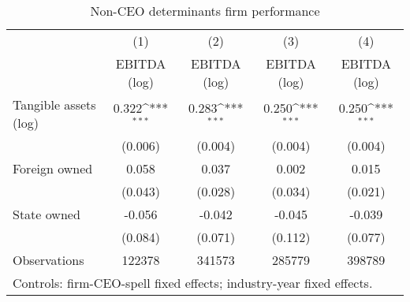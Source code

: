\begin{table}[htbp]\centering
\def\sym#1{\ifmmode^{#1}\else\(^{#1}\)\fi}
\caption{Non-CEO determinants firm performance}
\begin{tabular}{l*{4}{c}}
\hline\hline
                    &\multicolumn{1}{c}{(1)}&\multicolumn{1}{c}{(2)}&\multicolumn{1}{c}{(3)}&\multicolumn{1}{c}{(4)}\\
                    &\multicolumn{1}{c}{EBITDA (log)}&\multicolumn{1}{c}{EBITDA (log)}&\multicolumn{1}{c}{EBITDA (log)}&\multicolumn{1}{c}{EBITDA (log)}\\
\hline
Tangible assets (log)&       0.322\sym{***}&       0.283\sym{***}&       0.250\sym{***}&       0.250\sym{***}\\
                    &     (0.006)         &     (0.004)         &     (0.004)         &     (0.004)         \\
[1em]
Foreign owned       &       0.058         &       0.037         &       0.002         &       0.015         \\
                    &     (0.043)         &     (0.028)         &     (0.034)         &     (0.021)         \\
[1em]
State owned         &      -0.056         &      -0.042         &      -0.045         &      -0.039         \\
                    &     (0.084)         &     (0.071)         &     (0.112)         &     (0.077)         \\
\hline
Observations        &      122378         &      341573         &      285779         &      398789         \\
\hline\hline
\multicolumn{5}{l}{\footnotesize Controls: firm-CEO-spell fixed effects; industry-year fixed effects.}\\
\end{tabular}
\end{table}
